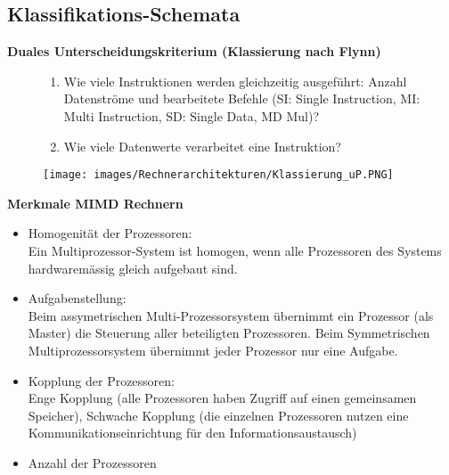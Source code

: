 \subsection{Klassifikations-Schemata}
\textbf{Duales Unterscheidungskriterium (Klassierung nach Flynn)}
\begin{figure}[htbp]
	
	\begin{minipage}{0.45\textwidth}		
		\begin{enumerate}[noitemsep,topsep=0pt]
			\item Wie viele Instruktionen werden gleichzeitig ausgeführt: Anzahl Datenströme und bearbeitete Befehle (SI: Single Instruction, MI: Multi Instruction, SD: Single Data, MD Mul)?
			
			\item Wie viele Datenwerte verarbeitet eine Instruktion?
		\end{enumerate}	
	\end{minipage}
	\hfill		
	\begin{minipage}{0.5\textwidth} 
		\texttt{[image: images/Rechnerarchitekturen/Klassierung\_uP.PNG]}
	\end{minipage}
	
\end{figure}

\clearpage
\textbf{Merkmale MIMD Rechnern}

\begin{itemize}[noitemsep,topsep=0pt]
	\item Homogenität der Prozessoren:\\
	Ein Multiprozessor-System ist homogen, wenn alle Prozessoren des Systems hardwaremässig gleich aufgebaut sind.
	
	\item Aufgabenstellung:\\
	Beim assymetrischen Multi-Prozessorsystem übernimmt ein Prozessor (als Master) die Steuerung aller beteiligten Prozessoren.
	Beim Symmetrischen Multiprozessorsystem übernimmt jeder Prozessor nur eine Aufgabe.
	
	\item Kopplung der Prozessoren:\\
	Enge Kopplung (alle Prozessoren haben Zugriff auf einen gemeinsamen Speicher), Schwache Kopplung (die einzelnen Prozessoren nutzen eine Kommunikationseinrichtung für den Informationsaustausch)
	
	\item Anzahl der Prozessoren
\end{itemize}
\vspace{-0.5cm}
